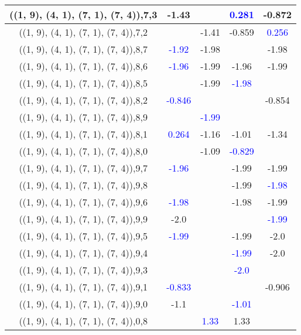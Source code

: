 \documentclass{article}
\begin{document}
\begin{center}
\begin{longtable}{|c|c|c|c|c|}
        	\hline
        	((1, 9), (4, 1), (7, 1), (7, 4)),7,3&-1.43&& \textcolor{blue}{0.281}&-0.872\\
        	\hline
        	((1, 9), (4, 1), (7, 1), (7, 4)),7,2&&-1.41&-0.859& \textcolor{blue}{0.256}\\
        	\hline
        	((1, 9), (4, 1), (7, 1), (7, 4)),8,7& \textcolor{blue}{-1.92}&-1.98&&-1.98\\
        	\hline
        	((1, 9), (4, 1), (7, 1), (7, 4)),8,6& \textcolor{blue}{-1.96}&-1.99&-1.96&-1.99\\
        	\hline
        	((1, 9), (4, 1), (7, 1), (7, 4)),8,5&&-1.99& \textcolor{blue}{-1.98}&\\
        	\hline
        	((1, 9), (4, 1), (7, 1), (7, 4)),8,2& \textcolor{blue}{-0.846}&&&-0.854\\
        	\hline
        	((1, 9), (4, 1), (7, 1), (7, 4)),8,9&& \textcolor{blue}{-1.99}&&\\
        	\hline
        	((1, 9), (4, 1), (7, 1), (7, 4)),8,1& \textcolor{blue}{0.264}&-1.16&-1.01&-1.34\\
        	\hline
        	((1, 9), (4, 1), (7, 1), (7, 4)),8,0&&-1.09& \textcolor{blue}{-0.829}&\\
        	\hline
        	((1, 9), (4, 1), (7, 1), (7, 4)),9,7& \textcolor{blue}{-1.96}&&-1.99&-1.99\\
        	\hline
        	((1, 9), (4, 1), (7, 1), (7, 4)),9,8&&&-1.99& \textcolor{blue}{-1.98}\\
        	\hline
        	((1, 9), (4, 1), (7, 1), (7, 4)),9,6& \textcolor{blue}{-1.98}&&-1.98&-1.99\\
        	\hline
        	((1, 9), (4, 1), (7, 1), (7, 4)),9,9&-2.0&&& \textcolor{blue}{-1.99}\\
        	\hline
        	((1, 9), (4, 1), (7, 1), (7, 4)),9,5& \textcolor{blue}{-1.99}&&-1.99&-2.0\\
        	\hline
        	((1, 9), (4, 1), (7, 1), (7, 4)),9,4&&& \textcolor{blue}{-1.99}&-2.0\\
        	\hline
        	((1, 9), (4, 1), (7, 1), (7, 4)),9,3&&& \textcolor{blue}{-2.0}&\\
        	\hline
        	((1, 9), (4, 1), (7, 1), (7, 4)),9,1& \textcolor{blue}{-0.833}&&&-0.906\\
        	\hline
        	((1, 9), (4, 1), (7, 1), (7, 4)),9,0&-1.1&& \textcolor{blue}{-1.01}&\\
        	\hline
        	((1, 9), (4, 1), (7, 1), (7, 4)),0,8&& \textcolor{blue}{1.33}&1.33&\\

\end{longtable}
\end{center}
\end{document}
